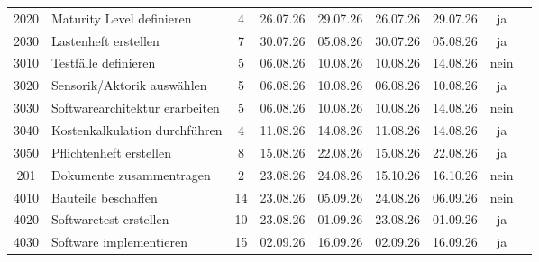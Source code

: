 \documentclass[
  a4paper,
  12pt,
  DIV=12,        %
  parskip=half,  %
  headings=small %
]{scrartcl}
\theoremstyle{definition}
\theoremstyle{definition}
\begin{document}
\begin{tabularx}{\textwidth}{cX@{}ccccccc}
\footnotesize 2020 & \footnotesize 	Maturity Level definieren	 & \footnotesize 4 & \footnotesize 	26.07.26 & \footnotesize 	29.07.26	 & \footnotesize 26.07.26	 & \footnotesize 29.07.26	  & \footnotesize ja \\
\footnotesize 2030 & \footnotesize 	Lastenheft erstellen	 & \footnotesize 7 & \footnotesize 	30.07.26 & \footnotesize 	05.08.26	 & \footnotesize 30.07.26	 & \footnotesize 05.08.26	  & \footnotesize ja\\
\footnotesize 3010 & \footnotesize 	Testfälle definieren	 & \footnotesize 5	 & \footnotesize 06.08.26	 & \footnotesize 10.08.26 & \footnotesize 10.08.26 & \footnotesize 14.08.26 & \footnotesize nein \\
\footnotesize 3020 & \footnotesize Sensorik/Aktorik auswählen & \footnotesize 5 & \footnotesize 06.08.26 & \footnotesize 10.08.26 & \footnotesize 06.08.26 & \footnotesize 10.08.26 & \footnotesize ja \\
\footnotesize 3030 & \footnotesize Softwarearchitektur erarbeiten & \footnotesize 5 & \footnotesize 06.08.26 & \footnotesize 10.08.26 & \footnotesize 10.08.26 & \footnotesize 14.08.26 & \footnotesize nein \\
\footnotesize 3040 & \footnotesize Kostenkalkulation durchführen & \footnotesize 4 & \footnotesize 11.08.26 & \footnotesize 14.08.26 & \footnotesize 11.08.26 & \footnotesize 14.08.26 & \footnotesize ja \\
\footnotesize 3050 & \footnotesize Pflichtenheft erstellen & \footnotesize 8 & \footnotesize 15.08.26 & \footnotesize 22.08.26 & \footnotesize 15.08.26 & \footnotesize 22.08.26 & \footnotesize ja \\
\footnotesize 201 & \footnotesize Dokumente zusammentragen & \footnotesize 2 & \footnotesize 23.08.26 & \footnotesize 24.08.26 & \footnotesize 15.10.26 & \footnotesize 16.10.26 &  \footnotesize nein \\
\footnotesize 4010 & \footnotesize Bauteile beschaffen & \footnotesize 14 & \footnotesize 23.08.26 & \footnotesize 05.09.26 & \footnotesize 24.08.26 & \footnotesize 06.09.26 & \footnotesize nein \\
\footnotesize 4020 & \footnotesize Softwaretest erstellen & \footnotesize 10 & \footnotesize 23.08.26 & \footnotesize 01.09.26 & \footnotesize 23.08.26 & \footnotesize 01.09.26 & \footnotesize ja \\
\footnotesize 4030 & \footnotesize Software implementieren & \footnotesize 15 & \footnotesize 02.09.26 & \footnotesize 16.09.26 & \footnotesize 02.09.26 & \footnotesize 16.09.26 & \footnotesize ja \\

\end{tabularx}
\end{document}

